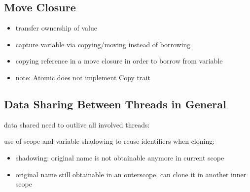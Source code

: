 \documentclass[8pt]{extarticle}
\begin{document}
\begin{multicols*}{2}
  \subsection{Move Closure}
  \begin{itemize}
  \item transfer ownership of value
  \item capture variable via copying/moving instead of borrowing
  \item copying reference in a move closure in order to borrow from variable
  \item note: Atomic does not implement Copy trait
  \end{itemize}
  
  \subsection{Data Sharing Between Threads in General}
  data shared need to outlive all involved threads:

    use of scope and variable shadowing to reuse identifiers when cloning:
    \begin{itemize}
    \item shadowing: original name is not obtainable anymore in current scope
    \item original name still obtainable in an outerscope, can clone it in another inner scope
    \end{itemize}
    

\end{multicols*}
\end{document}

